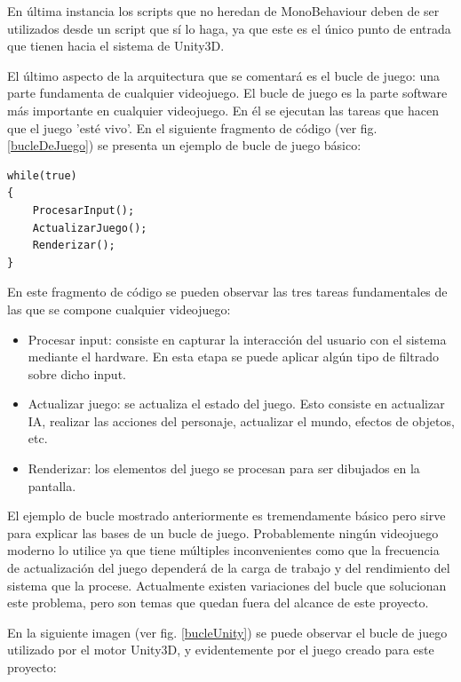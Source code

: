 En última instancia los scripts que no heredan de MonoBehaviour deben de ser utilizados desde un script que sí lo haga, ya que este es el único punto de entrada que tienen hacia el sistema de Unity3D.

El último aspecto de la arquitectura que se comentará es el bucle de juego: una parte fundamenta de cualquier videojuego.
El bucle de juego es la parte software más importante en cualquier videojuego. En él se ejecutan las tareas que hacen que el juego 'esté vivo'.
En el siguiente fragmento de código (ver fig. \ref{bucleDeJuego}) se presenta un ejemplo de bucle de juego básico:

\begin{lstlisting}[caption={Código de bucle de juego básico},label=bucleDeJuego]
while(true)
{
	ProcesarInput();
	ActualizarJuego();
	Renderizar();
}
\end{lstlisting}

En este fragmento de código se pueden observar las tres tareas fundamentales de las que se compone cualquier videojuego:

\begin{itemize}
	\item Procesar input: consiste en capturar la interacción del usuario con el sistema mediante el hardware. En esta etapa se puede aplicar algún tipo de filtrado sobre dicho input.
	\item Actualizar juego: se actualiza el estado del juego. Esto consiste en actualizar IA, realizar las acciones del personaje, actualizar el mundo, efectos de objetos, etc.
	\item Renderizar: los elementos del juego se procesan para ser dibujados en la pantalla.
\end{itemize}

El ejemplo de bucle mostrado anteriormente es tremendamente básico pero sirve para explicar las bases de un bucle de juego. Probablemente ningún videojuego moderno lo utilice ya que tiene múltiples inconvenientes como que la frecuencia de actualización del juego dependerá de la carga de trabajo y del rendimiento del sistema que la procese. Actualmente existen variaciones del bucle que solucionan este problema, pero son temas que quedan fuera del alcance de este proyecto.

En la siguiente imagen (ver fig. \ref{bucleUnity}) se puede observar el bucle de juego utilizado por el motor Unity3D, y evidentemente por el juego creado para este proyecto:

